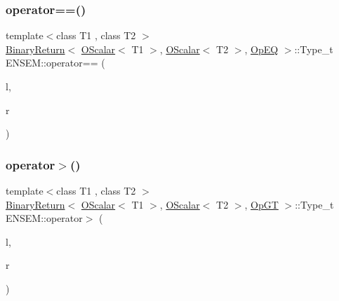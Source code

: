 \mbox{\label{group__obsscalar_ga95c536ecc3b51c1ac09a016d357d7237}} 
\subsubsection{\texorpdfstring{operator==()}{operator==()}}
{\footnotesize\ttfamily template$<$class T1 , class T2 $>$ \\
\mbox{\hyperlink{structENSEM_1_1BinaryReturn}{Binary\+Return}}$<$ \mbox{\hyperlink{classENSEM_1_1OScalar}{O\+Scalar}}$<$ T1 $>$, \mbox{\hyperlink{classENSEM_1_1OScalar}{O\+Scalar}}$<$ T2 $>$, \mbox{\hyperlink{structENSEM_1_1OpEQ}{Op\+EQ}} $>$\+::Type\+\_\+t E\+N\+S\+E\+M\+::operator== (\begin{DoxyParamCaption}\item[{const \mbox{\hyperlink{classENSEM_1_1OScalar}{O\+Scalar}}$<$ T1 $>$ \&}]{l,  }\item[{const \mbox{\hyperlink{classENSEM_1_1OScalar}{O\+Scalar}}$<$ T2 $>$ \&}]{r }\end{DoxyParamCaption})\hspace{0.3cm}{\ttfamily [inline]}}

\mbox{\label{group__obsscalar_ga8a16530cd60ff38f2be9575251898ac2}} 
\subsubsection{\texorpdfstring{operator$>$()}{operator>()}}
{\footnotesize\ttfamily template$<$class T1 , class T2 $>$ \\
\mbox{\hyperlink{structENSEM_1_1BinaryReturn}{Binary\+Return}}$<$ \mbox{\hyperlink{classENSEM_1_1OScalar}{O\+Scalar}}$<$ T1 $>$, \mbox{\hyperlink{classENSEM_1_1OScalar}{O\+Scalar}}$<$ T2 $>$, \mbox{\hyperlink{structENSEM_1_1OpGT}{Op\+GT}} $>$\+::Type\+\_\+t E\+N\+S\+E\+M\+::operator$>$ (\begin{DoxyParamCaption}\item[{const \mbox{\hyperlink{classENSEM_1_1OScalar}{O\+Scalar}}$<$ T1 $>$ \&}]{l,  }\item[{const \mbox{\hyperlink{classENSEM_1_1OScalar}{O\+Scalar}}$<$ T2 $>$ \&}]{r }\end{DoxyParamCaption})\hspace{0.3cm}{\ttfamily [inline]}}

